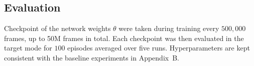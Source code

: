 \documentclass{article}
\begin{document}
\subsection*{Evaluation}
Checkpoint of the network weights $\theta$ were taken during training every $500,000$ frames, up to 50M frames in total. Each checkpoint was then evaluated in the target mode for $100$ episodes averaged over five runs. Hyperparameters are kept consistent with the baseline experiments in Appendix~B. 

\begin{figure}[H]
\centering
{}
\\

\end{figure}
\end{document}
